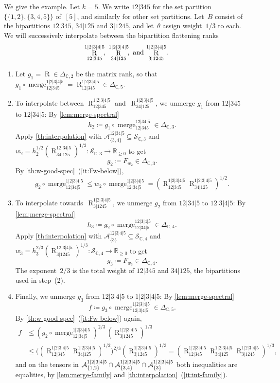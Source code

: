 \documentclass[11pt,letterpaper]{article}
\DeclareMathOperator{\tensorrank}{R}
\DeclareMathOperator{\merge}{merge}
\newcommand{\RR}{\mathbb{R}}
\newcommand{\CC}{\mathbb{C}}
\begin{document}
We give the example. Let $k = 5$. We write $12|345$ for the set partition $\{\{1,2\},\{3,4,5\}\}$ of~$[5]$, and similarly for other set partitions. Let~$B$ consist of the bipartitions $12|345$, $34|125$ and $3|1245$, and let~$\theta$ assign weight~$1/3$ to each. We will successively interpolate between the bipartition flattening ranks 
\[
\tensorrank^{1|2|3|4|5}_{12|345}\!,\,\,
\tensorrank^{1|2|3|4|5}_{34|125}\!,\,\,\textnormal{and}\, \tensorrank^{1|2|3|4|5}_{3|1245}\!.
\]
\begin{enumerate}[(1)]
\item 
Let $g_1 = \tensorrank \in \Delta_{\CC,2}$ be the matrix rank, so that $g_1 \circ \merge^{1|2|3|4|5}_{12|345} = \tensorrank^{1|2|3|4|5}_{12|345} \in \Delta_{\CC,5}$.
\item To interpolate between $\tensorrank^{1|2|3|4|5}_{12|345}$ and~$\tensorrank^{1|2|3|4|5}_{34|125}$, we unmerge $g_1$ from $12|345$ to $12|34|5$: By \cref{lem:merge-spectral} 
\[h_2 \coloneqq g_1 \circ \merge^{12|34|5}_{12|345} \in \Delta_{\CC,3}.
\] 
Apply \cref{th:interpolation} with $\mathcal{A}^{12|34|5}_{\{3,4\}} \subseteq \mathcal{S}_{\CC,3}$ and $w_2 = h_2^{1/2} (\tensorrank^{12|34|5}_{34|125})^{1/2} \colon \mathcal{S}_{\CC,3} \to \RR_{\geq 0}$ to get
\[
g_2 \coloneqq F_{w_2} \in \Delta_{\CC,3}.
\]
By \cref{th:w-good-spec}~(\ref{it:Fw-below}),
\[
g_2 \circ \merge^{1|2|3|4|5}_{12|34|5} \leq w_2 \circ \merge^{1|2|3|4|5}_{12|34|5} = (\tensorrank^{1|2|3|4|5}_{12|345} \tensorrank^{1|2|3|4|5}_{34|125})^{1/2}.
\]
\item To interpolate towards~$\tensorrank^{1|2|3|4|5}_{3|1245}$, we unmerge $g_2$ from $12|34|5$ to $12|3|4|5$: By \cref{lem:merge-spectral}
\[
h_3 \coloneqq g_2 \circ \merge^{12|3|4|5}_{12|34|5} \in \Delta_{\CC,4}.
\]
Apply \cref{th:interpolation} with $\mathcal{A}^{12|3|4|5}_{\{3\}} \subseteq \mathcal{S}_{\CC,4}$ and $w_3 = h_3^{2/3} (\tensorrank^{12|3|4|5}_{3|1245})^{1/3} \colon \mathcal{S}_{\CC,4} \to \RR_{\geq 0}$ to get
\[
g_3 \coloneqq F_{w_3} \in \Delta_{\CC,4}.
\]
The exponent~$2/3$ is the total weight of $12|345$ and $34|125$, the bipartitions used in step~(2).
\item Finally, we unmerge $g_3$ from $12|3|4|5$ to $1|2|3|4|5$: By \cref{lem:merge-spectral}
\[
f \coloneqq g_3 \circ \merge^{1|2|3|4|5}_{12|3|4|5} \in \Delta_{\CC,5}.
\]
By \cref{th:w-good-spec}~(\ref{it:Fw-below}) again,
\begin{align*}
f &\leq (g_2 \circ \merge^{1|2|3|4|5}_{12|34|5})^{2/3} \, (\tensorrank^{1|2|3|4|5}_{3|1245})^{1/3} \\
&\leq \bigl( (\tensorrank^{1|2|3|4|5}_{12|345} \tensorrank^{1|2|3|4|5}_{34|125})^{1/2} \bigr)^{2/3} (\tensorrank^{1|2|3|4|5}_{3|1245})^{1/3} = (\tensorrank^{1|2|3|4|5}_{12|345} \tensorrank^{1|2|3|4|5}_{34|125} \tensorrank^{1|2|3|4|5}_{3|1245})^{1/3},
\end{align*}
and on the tensors in $\mathcal{A}^{1|2|3|4|5}_{\smash[b]{\{1,2\}}} \cap \mathcal{A}^{1|2|3|4|5}_{\smash[b]{\{3,4\}}} \cap \mathcal{A}^{1|2|3|4|5}_{\smash[b]{\{3\}}}$ both inequalities are equalities, by \cref{lem:merge-family} and \cref{th:interpolation}~(\ref{it:int-family}).
\end{enumerate}
\end{document}
